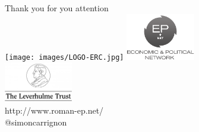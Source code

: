 \documentclass[12pt, notes=show]{beamer}
\begin{document}
\begin{frame}
	\begin{center}
		Thank you for you attention\\
		\vspace{.5cm}
		\texttt{[image: images/LOGO-ERC.jpg]} \hfil	\includegraphics[width=3cm]{../../logos/epnetLogo.png}\\
		\includegraphics[width=3cm]{images/leverhulme}\\
		\vspace{.5cm}
		\scriptsize
			http://www.roman-ep.net/\\
			@simoncarrignon
	\end{center}


\end{frame}
\end{document}
